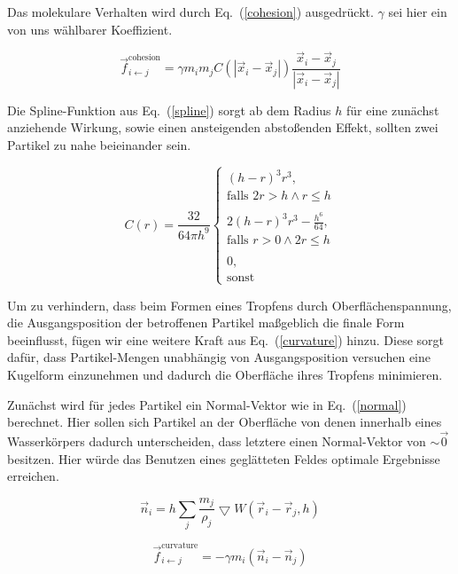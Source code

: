 \documentclass[a4paper]{paper}
\renewcommand{\eqref}[1]{Eq.~(\ref{#1})}
\begin{document}
Das molekulare Verhalten wird durch \eqref{cohesion} ausgedrückt. $\gamma$ sei hier ein von uns wählbarer Koeffizient.

\begin{equation}
\label{cohesion}
\vec{f}_{i\leftarrow j}^{\text{cohesion}} = \gamma m_{i} m_{j} C(|\vec{x}_i - \vec{x}_j|)\frac{\vec{x}_i - \vec{x}_j}{|\vec{x}_i - \vec{x}_j|}
\end{equation}

Die Spline-Funktion aus \eqref{spline} sorgt ab dem Radius $h$ für eine zunächst anziehende Wirkung, sowie einen ansteigenden abstoßenden Effekt, sollten zwei Partikel zu nahe beieinander sein.

\begin{equation}
\label{spline}
C(r) = \frac{32}{64 \pi h^9}
\begin{cases}
(h-r)^3r^3,   \\ \text{falls }  2r > h \land r \leq h\\

\\ 
2(h-r)^3r^3 - \frac{h^6}{64}, \\ \text{falls } r > 0 \land 2r \leq h\\
\\
0, \\ \text{sonst}  
\end{cases}
\end{equation}




Um zu verhindern, dass beim Formen eines Tropfens durch Oberflächenspannung, die Ausgangsposition der betroffenen Partikel maßgeblich die finale Form beeinflusst, fügen wir eine weitere Kraft aus \eqref{curvature} hinzu.
Diese sorgt dafür, dass Partikel-Mengen unabhängig von Ausgangsposition versuchen eine Kugelform einzunehmen und dadurch die Oberfläche ihres Tropfens minimieren.


Zunächst wird für jedes Partikel ein Normal-Vektor wie in \eqref{normal} berechnet. Hier sollen sich Partikel an der Oberfläche von denen innerhalb eines Wasserkörpers dadurch unterscheiden, dass letztere einen Normal-Vektor von $\sim \vec{0}$ besitzen. Hier würde das Benutzen eines geglätteten Feldes optimale Ergebnisse erreichen.

\begin{equation}
\label{normal}
\vec{n}_{i} = h\sum_{j}\frac{m_{j}}{\rho_{j}}\bigtriangledown W (\vec{r}_{i}-\vec{r}_{j},h)
\end{equation}

\begin{equation}
\label{curvature}
\vec{f}_{i\leftarrow j}^{\text{curvature}} = -\gamma m_{i}(\vec{n}_i - \vec{n}_j)
\end{equation}
\end{document}
